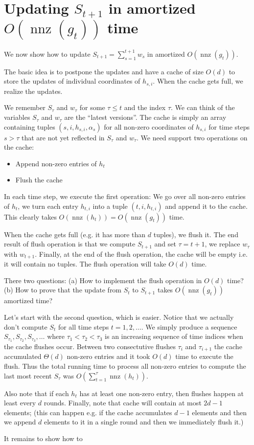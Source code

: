 \documentclass{article}
\DeclareMathOperator*{\nnz}{nnz}
\begin{document}
\section{Updating $S_{t+1}$ in amortized $O(\nnz(g_t))$ time}

We now show how to update $S_{t+1} = \sum_{s=1}^{t+1} w_s$ in amortized
$O(\nnz(g_t))$.

The basic idea is to postpone the updates and have a cache of size $O(d)$ to
store the updates of individual coordinates of $h_{s,i}$. When the cache gets
full, we realize the updates.

We remember $S_\tau$ and $w_\tau$ for some $\tau \le t$ and the index $\tau$. We can think of
the variables $S_\tau$ and $w_\tau$ are the ``latest versions''. The cache is simply
an array containing tuples $(s,i,h_{s,i},\alpha_s)$ for all non-zero coordinates
of $h_{s,i}$ for time steps $s > \tau$ that are not yet reflected in $S_\tau$ and $w_\tau$.
We need support two operations on the cache:
\begin{itemize}
\item Append non-zero entries of $h_t$
\item Flush the cache
\end{itemize}

In each time step, we execute the first operation: We go over all non-zero
entries of $h_t$, we turn each entry $h_{t,i}$ into a tuple $(t,i,h_{t,i})$
and append it to the cache. This clearly takes $O(\nnz(h_t)) = O(\nnz(g_t))$
time.

When the cache gets full (e.g. it has more than $d$ tuples), we flush it.
The end result of flush operation is that we compute $S_{t+1}$ and
set $\tau = t + 1$, we replace $w_\tau$ with $w_{t+1}$. Finally, at the end
of the flush operation, the cache will be empty i.e. it will contain no tuples.
The flush operation will take $O(d)$ time.

There two questions: (a) How to implement the flush operation in $O(d)$ time?
(b) How to prove that the update from $S_t$ to $S_{t+1}$ takes $O(\nnz(g_t))$
amortized time?

Let's start with the second question, which is easier. Notice
that we actually don't compute $S_t$ for all time steps $t=1,2,\dots$.
We simply produce a sequence $S_{\tau_1}, S_{\tau_2}, S_{\tau_3}, \dots$
where $\tau_1 < \tau_2 < \tau_3$ is an increasing sequence of time indices
when the cache flushes occur. Between two consectutive flushes
$\tau_i$ and $\tau_{i+1}$ the cache accumulated $\Theta(d)$ non-zero entries
and it took $O(d)$ time to execute the flush. Thus the total
running time to process all non-zero entries to compute the last most recent
$S_\tau$ was $O(\sum_{t=1}^\tau \nnz(h_t))$.

Also note that if each $h_t$ has at least one non-zero entry, then flushes
happen at least every $d$ rounds. Finally, note that cache will contain at most
$2d-1$ elements; (this can happen e.g. if the cache accumulates $d-1$ elements
and then we append $d$ elements to it in a single round and then we immediately
flush it.)

It remains to show how to
\end{document}
